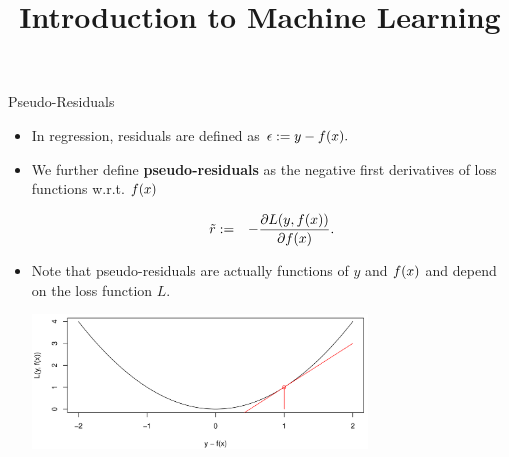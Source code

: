




\newcommand{\titlefigure}{figure_man/optimization_steps.jpeg}
\newcommand{\learninggoals}{
\item Know the concept of pseudo-residuals 
\item Understand the relationship between pseudo-residuals and gradient descent 
}

\title{Introduction to Machine Learning}
\date{}






\begin{vbframe}{Pseudo-Residuals}

\begin{itemize}
	\item In regression, residuals are defined as $
			\epsilon := y - f(x).$
\item We further define \textbf{pseudo-residuals} as the negative first derivatives of loss functions w.r.t. $f(x)$

\vspace*{-0.3cm}
  \begin{eqnarray*}
    \tilde r &:=& - \frac{\partial \Lxy}{\partial \fx}.  %
  \end{eqnarray*}
\item Note that pseudo-residuals are actually functions of $y$ and $f(x)$ and depend on the loss function $L$. %

\includegraphics[width=0.7\textwidth]{figure_man/loss.png}

\end{itemize}

\end{vbframe}

